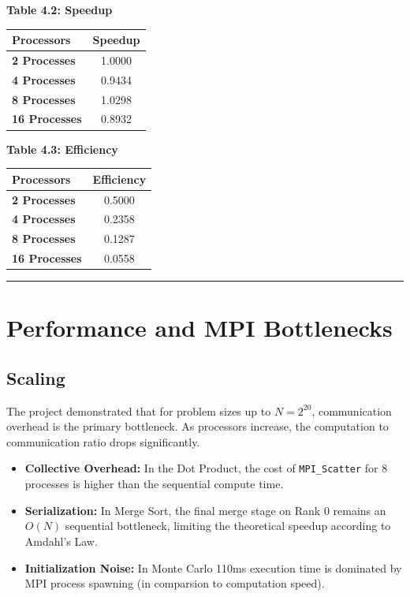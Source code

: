 \documentclass[11pt]{article}
\begin{document}
\begin{center}
\textbf{Table 4.2: Speedup} \\
\begin{tabular}{@{}lc@{}}
\toprule
Processors & Speedup \\
\midrule
\textbf{2 Processes} & 1.0000 \\
\textbf{4 Processes} & 0.9434 \\
\textbf{8 Processes} & 1.0298 \\
\textbf{16 Processes} & 0.8932 \\
\bottomrule
\end{tabular}
\end{center}

\begin{center}
\textbf{Table 4.3: Efficiency} \\
\begin{tabular}{@{}lc@{}}
\toprule
Processors & Efficiency \\
\midrule
\textbf{2 Processes} & 0.5000 \\
\textbf{4 Processes} & 0.2358 \\
\textbf{8 Processes} & 0.1287 \\
\textbf{16 Processes} & 0.0558 \\
\bottomrule
\end{tabular}
\end{center}

\noindent\rule{\textwidth}{0.4pt}

\section*{\color{white}Performance and MPI Bottlenecks}

\subsection*{Scaling}
The project demonstrated that for problem sizes up to $N = 2^{20}$, communication overhead is the primary bottleneck. As processors increase, the computation to communication ratio drops significantly.
\begin{itemize}
    \item \textbf{Collective Overhead:} In the Dot Product, the cost of \texttt{MPI\_Scatter} for 8 processes is higher than the sequential compute time.
    \item \textbf{Serialization:} In Merge Sort, the final merge stage on Rank 0 remains an $O(N)$ sequential bottleneck, limiting the theoretical speedup according to Amdahl's Law.
    \item \textbf{Initialization Noise:} In Monte Carlo 110ms execution time is dominated by MPI process spawning (in comparsion to computation speed).
\end{itemize}
\end{document}
